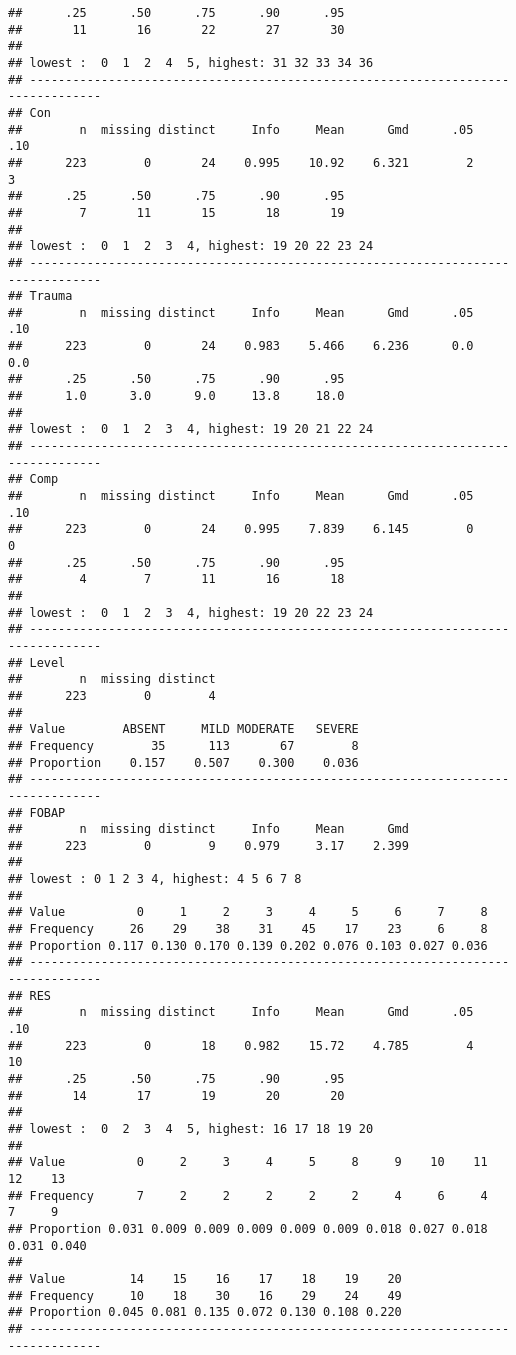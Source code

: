 \documentclass[
]{book}
\begin{document}
\begin{verbatim}
##      .25      .50      .75      .90      .95 
##       11       16       22       27       30 
## 
## lowest :  0  1  2  4  5, highest: 31 32 33 34 36
## --------------------------------------------------------------------------------
## Con 
##        n  missing distinct     Info     Mean      Gmd      .05      .10 
##      223        0       24    0.995    10.92    6.321        2        3 
##      .25      .50      .75      .90      .95 
##        7       11       15       18       19 
## 
## lowest :  0  1  2  3  4, highest: 19 20 22 23 24
## --------------------------------------------------------------------------------
## Trauma 
##        n  missing distinct     Info     Mean      Gmd      .05      .10 
##      223        0       24    0.983    5.466    6.236      0.0      0.0 
##      .25      .50      .75      .90      .95 
##      1.0      3.0      9.0     13.8     18.0 
## 
## lowest :  0  1  2  3  4, highest: 19 20 21 22 24
## --------------------------------------------------------------------------------
## Comp 
##        n  missing distinct     Info     Mean      Gmd      .05      .10 
##      223        0       24    0.995    7.839    6.145        0        0 
##      .25      .50      .75      .90      .95 
##        4        7       11       16       18 
## 
## lowest :  0  1  2  3  4, highest: 19 20 22 23 24
## --------------------------------------------------------------------------------
## Level 
##        n  missing distinct 
##      223        0        4 
##                                               
## Value        ABSENT     MILD MODERATE   SEVERE
## Frequency        35      113       67        8
## Proportion    0.157    0.507    0.300    0.036
## --------------------------------------------------------------------------------
## FOBAP 
##        n  missing distinct     Info     Mean      Gmd 
##      223        0        9    0.979     3.17    2.399 
## 
## lowest : 0 1 2 3 4, highest: 4 5 6 7 8
##                                                                 
## Value          0     1     2     3     4     5     6     7     8
## Frequency     26    29    38    31    45    17    23     6     8
## Proportion 0.117 0.130 0.170 0.139 0.202 0.076 0.103 0.027 0.036
## --------------------------------------------------------------------------------
## RES 
##        n  missing distinct     Info     Mean      Gmd      .05      .10 
##      223        0       18    0.982    15.72    4.785        4       10 
##      .25      .50      .75      .90      .95 
##       14       17       19       20       20 
## 
## lowest :  0  2  3  4  5, highest: 16 17 18 19 20
##                                                                             
## Value          0     2     3     4     5     8     9    10    11    12    13
## Frequency      7     2     2     2     2     2     4     6     4     7     9
## Proportion 0.031 0.009 0.009 0.009 0.009 0.009 0.018 0.027 0.018 0.031 0.040
##                                                     
## Value         14    15    16    17    18    19    20
## Frequency     10    18    30    16    29    24    49
## Proportion 0.045 0.081 0.135 0.072 0.130 0.108 0.220
## --------------------------------------------------------------------------------
\end{verbatim}
\end{document}
